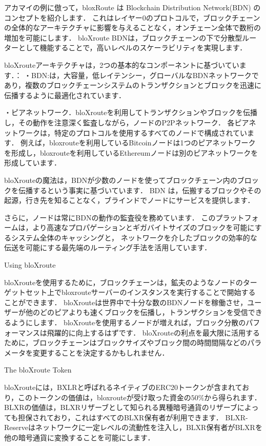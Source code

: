 \documentclass[a4paper,12pt]{jsarticle}
\begin{document}
アカマイの例に倣って，bloxRoute は Blockchain Distribution Network(BDN) のコンセプトを紹介します．
これはレイヤー0のプロトコルで，ブロックチェーンの全体的なアーキテクチャに影響を与えることなく，オンチェーン全体で数桁の増加を可能にします．
bloXroute BDNは，ブロックチェーンの下で分散型ルーターとして機能することで，高いレベルのスケーラビリティを実現します．

bloXrouteアーキテクチャは，2つの基本的なコンポーネントに基づいています．：
・BDN:は，大容量，低レイテンシー，グローバルなBDNネットワークであり，複数のブロックチェーンシステムのトランザクションとブロックを迅速に伝播するように最適化されています．

・ピアネットワーク．bloXrouteを利用してトランザクションやブロックを伝播し，その動作を注意深く監査しながら，ノードのP2Pネットワーク．
各ピアネットワークは，特定のプロトコルを使用するすべてのノードで構成されています．
例えば，bloxrouteを利用しているBitcoinノードは1つのピアネットワークを形成し，bloxrouteを利用しているEthereumノードは別のピアネットワークを形成しています．

bloXrouteの魔法は，BDNが少数のノードを使ってブロックチェーン内のブロックを伝播するという事実に基づいています．
BDN は，伝搬するブロックやその起源，行き先を知ることなく，ブラインドでノードにサービスを提供します．

さらに，ノードは常にBDNの動作の監査役を務めています．
このプラットフォームは，より高速なプロパゲーションとギガバイトサイズのブロックを可能にするシステム全体のキャッシングと，
ネットワークを介したブロックの効率的な伝送を可能にする最先端のルーティング手法を活用しています．

Using bloXroute

bloXrouteを使用するために，ブロックチェーンは，鉱夫のようなノードのターゲットセット上でbloxrouteサーバーのインスタンスを実行することで開始することができます．
bloXrouteは世界中で十分な数のBDNノードを稼働させ，ユーザーが他のどのピアよりも速くブロックを伝播し，トランザクションを受信できるようにします．
bloXrouteを使用するノードが増えれば，ブロック分散のパフォーマンスは飛躍的に向上するはずです．
bloXrouteの利点を最大限に活用するために，ブロックチェーンはブロックサイズやブロック間の時間間隔などのパラメータを変更することを決定するかもしれません．

The bloXroute Token

bloXrouteには，BXLRと呼ばれるネイティブのERC20トークンが含まれており，このトークンの価値は，bloxrouteが受け取った資金の$50\%$から得られます．
BLXRの価値は，BLXRリザーブとして知られる異種暗号通貨のリザーブによっても担保されており，これはすべてのBLXR保有者が利用できます．
BLXR-Reserveはネットワークに一定レベルの流動性を注入し，BLXR保有者がBLXRを他の暗号通貨に変換することを可能にします．
\end{document}
